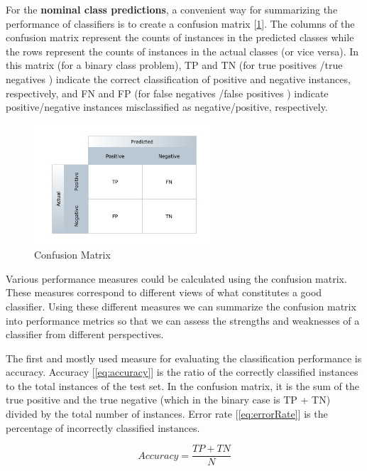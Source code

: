 For the \textbf{nominal class predictions}, a convenient way for summarizing the performance of classifiers 
is to create a confusion matrix [\ref{fig:confusionMatrix}]. The columns of the confusion matrix represent the counts of instances in 
the predicted classes while the rows represent the counts of instances in the actual classes (or vice versa). 
In this matrix (for a binary class problem), TP and TN (for true positives /true negatives ) indicate the 
correct classification of positive and negative instances, respectively, and FN and FP 
(for false negatives /false positives ) indicate positive/negative instances misclassified as 
negative/positive, respectively. 

\begin{figure}[ht]
    \centering
    \includegraphics[width=0.60\textwidth]{figures/10ConfusionMatrix.png}
    \caption{Confusion Matrix}
    \label{fig:confusionMatrix}
\end{figure}

Various performance measures could be calculated using the confusion matrix. These measures correspond 
to different views of what constitutes a good classifier. Using these different measures we can summarize 
the confusion matrix into performance metrics so that we can assess the strengths and weaknesses of a 
classifier from different perspectives.

The first and mostly used measure for evaluating the classification performance is accuracy. 
Accuracy [\ref{eq:accuracy}] is the ratio of the correctly classified instances to the total instances of 
the test set. In the confusion matrix, it is the sum of the true positive and the true negative 
(which in the binary case is TP + TN) divided by the total number of instances. Error rate [\ref{eq:errorRate}] 
is the percentage of incorrectly classified instances.

\begin{equation}
    Accuracy = \frac{TP+TN}{N} 
    \label{eq:accuracy}
\end{equation}

